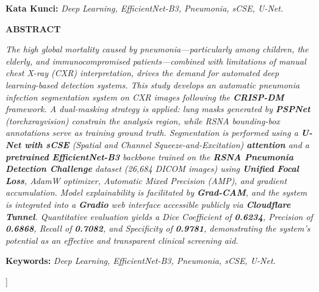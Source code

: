 \documentclass[12pt,a4paper,twocolumn]{article}
\begin{document}
\begin{@twocolumnfalse}
\begin{center}
\begin{minipage}{0.85\textwidth}
\vspace{6pt}
{\footnotesize\textbf{Kata Kunci:} \textit{Deep Learning, EfficientNet-B3, Pneumonia, sCSE, U-Net.}}
\end{minipage}

\vspace{16pt}

\begin{minipage}{0.85\textwidth}
\begin{center}
    {\normalsize\bfseries ABSTRACT}
\end{center}
\vspace{-14pt}
{\footnotesize\itshape\singlespacing
The high global mortality caused by pneumonia---particularly among children,
the elderly, and immunocompromised patients---combined with limitations of
manual chest X-ray (CXR) interpretation, drives the demand for automated
deep learning-based detection systems. This study develops an automatic
pneumonia infection segmentation system on CXR images following the
\textbf{CRISP-DM} framework. A \textit{dual-masking} strategy is applied:
lung masks generated by \textbf{PSPNet} (\textit{torchxrayvision}) constrain
the analysis region, while RSNA bounding-box annotations serve as training
ground truth. Segmentation is performed using a \textbf{U-Net with sCSE}
(\textit{Spatial and Channel Squeeze-and-Excitation}) \textbf{attention} and
a \textbf{pretrained EfficientNet-B3} backbone trained on the \textbf{RSNA
Pneumonia Detection Challenge} dataset (26,684 DICOM images) using
\textbf{Unified Focal Loss}, AdamW optimizer, Automatic Mixed Precision
(AMP), and gradient accumulation. Model explainability is facilitated by
\textbf{Grad-CAM}, and the system is integrated into a \textbf{Gradio} web
interface accessible publicly via \textbf{Cloudflare Tunnel}. Quantitative
evaluation yields a \textit{Dice Coefficient} of \textbf{0.6234},
\textit{Precision} of \textbf{0.6868}, \textit{Recall} of \textbf{0.7082},
and \textit{Specificity} of \textbf{0.9781}, demonstrating the system's
potential as an effective and transparent clinical screening aid.
\par}

\vspace{6pt}
{\footnotesize\textbf{Keywords:} \textit{Deep Learning, EfficientNet-B3, Pneumonia, sCSE, U-Net.}}
\end{minipage}

\vspace{20pt}

\end{center}
\end{@twocolumnfalse}
]
\end{document}
